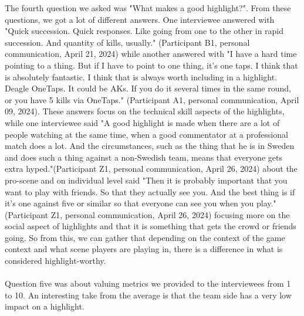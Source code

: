 The fourth question we asked was "What makes a good highlight?". From these questions, we got a lot of different answers. One interviewee answered with "Quick succession. Quick responses. Like going from one to the other in rapid succession. And quantity of kills, usually." (Participant B1, personal communication, April 21, 2024) while another answered with "I have a hard time pointing to a thing. But if I have to point to one thing, it's one taps. I think that is absolutely fantastic. I think that is always worth including in a highlight. Deagle OneTaps. It could be AKs. If you do it several times in the same round, or you have 5 kills via OneTaps." (Participant A1, personal communication, April 09, 2024). These answers focus on the technical skill aspects of the highlights, while one interviewee said "A good highlight is made when there are a lot of people watching at the same time, when a good commentator at a professional match does a lot. And the circumstances, such as the thing that he is in Sweden and does such a thing against a non-Swedish team, means that everyone gets extra hyped."(Participant Z1, personal communication, April 26, 2024) about the pro-scene and on individual level said "Then it is probably important that you want to play with friends. So that they actually see you. And the best thing is if it's one against five or similar so that everyone can see you when you play." (Participant Z1, personal communication, April 26, 2024) focusing more on the social aspect of highlights and that it is something that gets the crowd or friends going. So from this, we can gather that depending on the context of the game context and what scene players are playing in, there is a difference in what is considered highlight-worthy.\\\\
Question five was about valuing metrics we provided to the interviewees from 1 to 10. An interesting take from the average is that the team side has a very low impact on a highlight.\\\\
